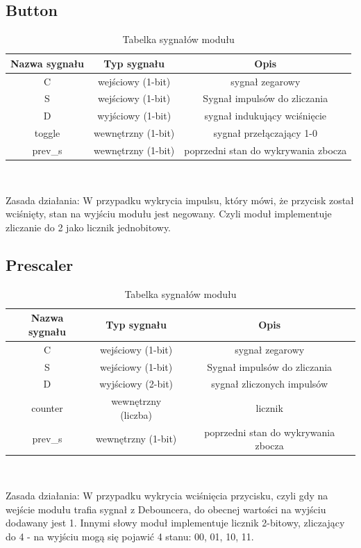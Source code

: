 \documentclass{article}
\begin{document}
\subsection{Button}
\begin{table}[H]
    \centering
    \begin{tabular}{|c|c|c|}
        \hline
        Nazwa sygnału & Typ sygnału & Opis \\
        \hline
        C  & wejściowy (1-bit)    & sygnał zegarowy    \\
        \hline
        S  & wejściowy (1-bit)   & Sygnał impulsów do zliczania    \\
        \hline
        D  & wyjściowy (1-bit)    & sygnał indukujący wciśnięcie\\
        \hline
        toggle  & wewnętrzny (1-bit)    & sygnał przełączający 1-0\\
        \hline
        prev\_s  & wewnętrzny (1-bit) & poprzedni stan do wykrywania zbocza \\
        \hline
    \end{tabular}\\
    \caption{Tabelka sygnałów modułu}
    \label{tab:tabela2}
\end{table}
Zasada działania: W przypadku wykrycia impulsu, który mówi, że przycisk został wciśnięty, stan na wyjściu modułu jest negowany. Czyli moduł 
implementuje zliczanie do 2 jako licznik jednobitowy. 
\subsection{Prescaler}
\begin{table}[H]
    \centering
    \begin{tabular}{|c|c|c|}
        \hline
        Nazwa sygnału & Typ sygnału & Opis \\
        \hline
        C  & wejściowy (1-bit)    & sygnał zegarowy    \\
        \hline
        S  & wejściowy (1-bit)   & Sygnał impulsów do zliczania    \\
        \hline
        D  & wyjściowy (2-bit)    & sygnał zliczonych impulsów\\
        \hline
        counter  & wewnętrzny (liczba)    & licznik\\
        \hline
        prev\_s  & wewnętrzny (1-bit) & poprzedni stan do wykrywania zbocza \\
        \hline
    \end{tabular}\\
    \caption{Tabelka sygnałów modułu}
    \label{tab:tabela3}
\end{table}
Zasada działania: W przypadku wykrycia wciśnięcia przycisku, czyli gdy na wejście modułu trafia sygnał z Debouncera, do obecnej wartości na wyjściu dodawany jest 1. 
Innymi słowy moduł implementuje licznik 2-bitowy, zliczający do 4 - na wyjściu mogą się pojawić 4 stanu: 00, 01, 10, 11.
\end{document}
